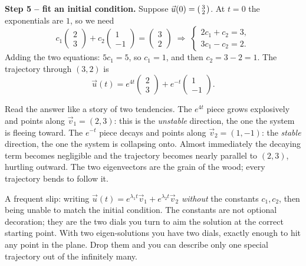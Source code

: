 \textbf{Step 5 -- fit an initial condition.} Suppose
$\vec u(0) = \begin{psmallmatrix} 3 \\ 2\end{psmallmatrix}$. At $t=0$ the
exponentials are $1$, so we need
\[
  c_1\begin{pmatrix} 2 \\ 3 \end{pmatrix}
  + c_2\begin{pmatrix} 1 \\ -1 \end{pmatrix}
  = \begin{pmatrix} 3 \\ 2 \end{pmatrix}
  \;\Longrightarrow\;
  \begin{cases} 2c_1 + c_2 = 3,\\ 3c_1 - c_2 = 2. \end{cases}
\]
Adding the two equations: $5c_1 = 5$, so $c_1 = 1$, and then $c_2 = 3 - 2 = 1$.
The trajectory through $(3,2)$ is
\[
  \vec u(t) = e^{4t}\begin{pmatrix} 2 \\ 3 \end{pmatrix}
            + e^{-t}\begin{pmatrix} 1 \\ -1 \end{pmatrix}.
\]

\begin{intuitionbox}
Read the answer like a story of two tendencies. The $e^{4t}$ piece grows
explosively and points along $\vec v_1 = (2,3)$: this is the \emph{unstable}
direction, the one the system is fleeing toward. The $e^{-t}$ piece decays and
points along $\vec v_2 = (1,-1)$: the \emph{stable} direction, the one the system
is collapsing onto. Almost immediately the decaying term becomes negligible and
the trajectory becomes nearly parallel to $(2,3)$, hurtling outward. The two
eigenvectors are the grain of the wood; every trajectory bends to follow it.
\end{intuitionbox}

\begin{trapbox}
A frequent slip: writing
$\vec u(t) = e^{\lambda_1 t}\vec v_1 + e^{\lambda_2 t}\vec v_2$ \emph{without} the
constants $c_1, c_2$, then being unable to match the initial condition. The
constants are not optional decoration; they are the two dials you turn to aim the
solution at the correct starting point. With two eigen-solutions you have two
dials, exactly enough to hit any point in the plane. Drop them and you can
describe only one special trajectory out of the infinitely many.
\end{trapbox}

